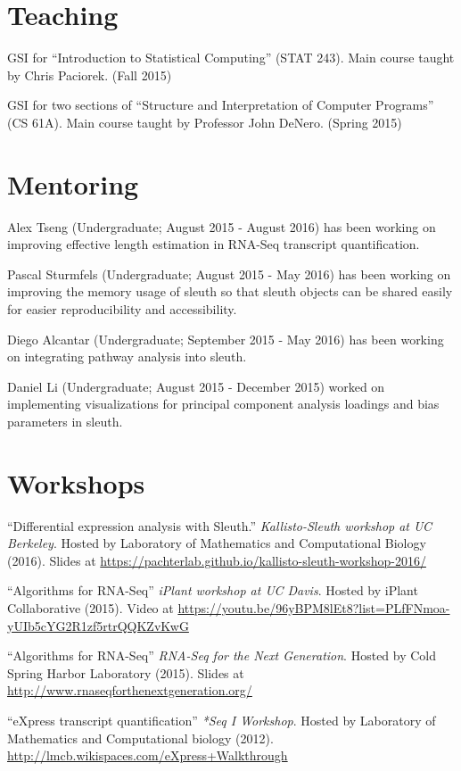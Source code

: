 \documentclass[overlapped]{res}
\begin{document}
\begin{resume}
\section{\sc Teaching}
GSI for ``Introduction to Statistical Computing'' (STAT 243). Main course taught
by Chris Paciorek. (Fall 2015)

GSI for two sections of ``Structure and Interpretation of Computer Programs''
(CS 61A). Main course taught by Professor John DeNero. (Spring 2015)

\section{\sc Mentoring}
Alex Tseng (Undergraduate; August 2015 - August 2016) has been working on improving effective length estimation in RNA-Seq transcript quantification.

Pascal Sturmfels (Undergraduate; August 2015 - May 2016) has been working on improving the memory usage of sleuth so that sleuth objects can be shared easily for easier reproducibility and accessibility.

Diego Alcantar (Undergraduate; September 2015 - May 2016) has been working on integrating pathway analysis into sleuth.

Daniel Li (Undergraduate; August 2015 - December 2015) worked on implementing visualizations for principal component analysis loadings and bias parameters in sleuth.

\section{\sc Workshops}
 ``Differential expression analysis with Sleuth.'' {\emph{Kallisto-Sleuth workshop at UC Berkeley}}. Hosted by Laboratory of Mathematics and Computational Biology (2016). Slides at \url{https://pachterlab.github.io/kallisto-sleuth-workshop-2016/}

``Algorithms for RNA-Seq'' {\emph{iPlant workshop at UC Davis}}. Hosted by iPlant Collaborative (2015). Video at \url{https://youtu.be/96yBPM8lEt8?list=PLfFNmoa-yUIb5cYG2R1zf5rtrQQKZvKwG}

``Algorithms for RNA-Seq'' {\emph{RNA-Seq for the Next Generation}}. Hosted by Cold Spring Harbor Laboratory (2015). Slides at \url{http://www.rnaseqforthenextgeneration.org/}

``eXpress transcript quantification'' {\emph{*Seq I Workshop}}. Hosted by Laboratory of Mathematics and Computational biology (2012). \url{http://lmcb.wikispaces.com/eXpress+Walkthrough}


\end{resume}
\end{document}
